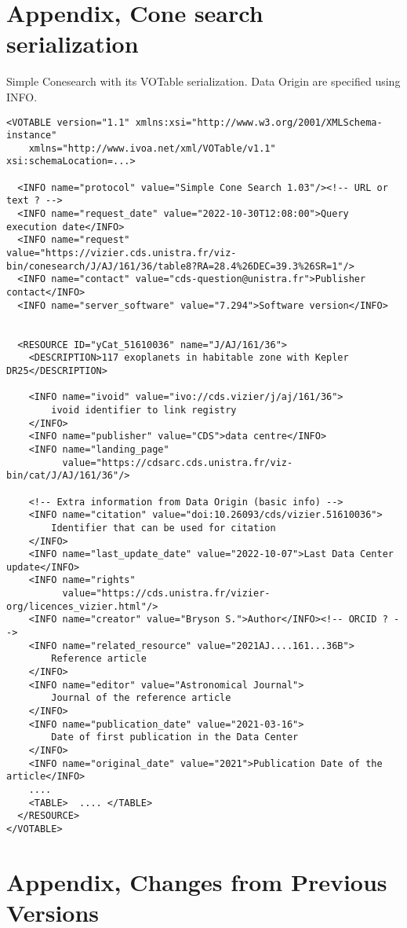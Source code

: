 \documentclass[11pt,a4paper]{ivoa}
\begin{document}
\appendix
\section{Appendix, Cone search serialization}\label{appendixA}
Simple Conesearch with its VOTable serialization. Data Origin are specified using  INFO.
\begin{verbatim}
<VOTABLE version="1.1" xmlns:xsi="http://www.w3.org/2001/XMLSchema-instance"
    xmlns="http://www.ivoa.net/xml/VOTable/v1.1" xsi:schemaLocation=...>

  <INFO name="protocol" value="Simple Cone Search 1.03"/><!-- URL or text ? -->
  <INFO name="request_date" value="2022-10-30T12:08:00">Query execution date</INFO>
  <INFO name="request"
value="https://vizier.cds.unistra.fr/viz-bin/conesearch/J/AJ/161/36/table8?RA=28.4%26DEC=39.3%26SR=1"/>
  <INFO name="contact" value="cds-question@unistra.fr">Publisher contact</INFO>
  <INFO name="server_software" value="7.294">Software version</INFO>


  <RESOURCE ID="yCat_51610036" name="J/AJ/161/36">
    <DESCRIPTION>117 exoplanets in habitable zone with Kepler DR25</DESCRIPTION>

    <INFO name="ivoid" value="ivo://cds.vizier/j/aj/161/36">
        ivoid identifier to link registry
    </INFO>
    <INFO name="publisher" value="CDS">data centre</INFO>
    <INFO name="landing_page"
          value="https://cdsarc.cds.unistra.fr/viz-bin/cat/J/AJ/161/36"/>

    <!-- Extra information from Data Origin (basic info) -->
    <INFO name="citation" value="doi:10.26093/cds/vizier.51610036">
        Identifier that can be used for citation
    </INFO>
    <INFO name="last_update_date" value="2022-10-07">Last Data Center update</INFO>
    <INFO name="rights" 
          value="https://cds.unistra.fr/vizier-org/licences_vizier.html"/>
    <INFO name="creator" value="Bryson S.">Author</INFO><!-- ORCID ? -->
    <INFO name="related_resource" value="2021AJ....161...36B">
        Reference article
    </INFO>
    <INFO name="editor" value="Astronomical Journal">
        Journal of the reference article
    </INFO>
    <INFO name="publication_date" value="2021-03-16">
        Date of first publication in the Data Center
    </INFO>
    <INFO name="original_date" value="2021">Publication Date of the article</INFO>
    ....
    <TABLE>  .... </TABLE>
  </RESOURCE>
</VOTABLE>
\end{verbatim}

\section{Appendix, Changes from Previous Versions}
\end{document}
